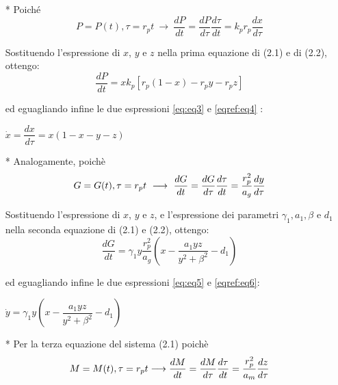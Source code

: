 \documentclass[12pt,oneside]{report}
\begin{document}
\vspace{2cm}
\noindent
\begin{itemize}
\item[*] Poiché \begin{equation}
\label{eq:eq3} 
P=P(t), \tau=r_pt   \   \longrightarrow \  
\dfrac{dP}{dt} = \dfrac{dP}{d\tau} \dfrac{d\tau}{dt} =  k_p r_p \dfrac{dx}{d\tau} 
\end{equation} 

 Sostituendo l'espressione di $x$, $y$ e $z$ nella prima equazione di (2.1) e di (2.2), ottengo:
\begin{equation}
\label{eqref:eq4}
\dfrac{dP}{dt} = x k_p  [r_p(1-x)-r_py-r_pz]
\end{equation}

ed eguagliando infine le due espressioni \eqref{eq:eq3} e \eqref{eqref:eq4} : 

\begin{center}
$
\dot{x} = \dfrac{dx}{d\tau} = x(1-x-y-z) 
$
\end{center}

\vspace{1cm}
\noindent
\item[*] Analogamente, poichè \begin{equation}
\label{eq:eq5} 
G=G(t), \tau=r_pt  \   \longrightarrow \   \dfrac{dG}{dt} = \dfrac{dG}{d\tau} \dfrac{d\tau}{dt} = \dfrac{r_p^2}{a_g} \dfrac{dy}{d\tau}  \\
\end{equation}

\noindent
Sostituendo l'espressione di $x$, $y$ e $z$, e l'espressione dei parametri $\gamma_1, a_1, \beta $ e $  d_1 $ nella seconda equazione di (2.1) e (2.2), ottengo:
\begin{equation}
\label{eqref:eq6}
\dfrac{dG}{dt}=  \gamma_1 y \dfrac{r_p^2}{a_g} \left(x -\dfrac{a_1yz}{y^2+\beta^2} -  d_1\right)
\end{equation}

ed eguagliando infine le due espressioni \eqref{eq:eq5} e \eqref{eqref:eq6}: 
\begin{center}
$\dot{y}= \gamma_1 y \left(x- \dfrac{a_1yz}{y^2+\beta^2} - d_1\right) $
\end{center}

\vspace*{1cm}
\noindent
\item[*] Per la terza equazione del sistema (2.1) poichè \begin{equation}
\label{eq:eq7} 
M=M(t), \tau=r_pt     \longrightarrow 
\dfrac{dM}{dt} = \dfrac{dM}{d\tau} \dfrac{d\tau}{dt} = \dfrac{r_p^2}{a_m} \dfrac{dz}{d\tau}  \\
\end{equation}


\end{itemize}
\end{document}
